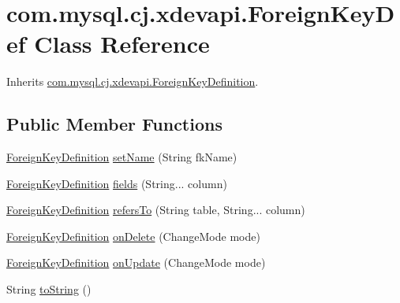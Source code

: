 \hypertarget{classcom_1_1mysql_1_1cj_1_1xdevapi_1_1_foreign_key_def}{}\section{com.\+mysql.\+cj.\+xdevapi.\+Foreign\+Key\+Def Class Reference}
\label{classcom_1_1mysql_1_1cj_1_1xdevapi_1_1_foreign_key_def}


Inherits \mbox{\hyperlink{interfacecom_1_1mysql_1_1cj_1_1xdevapi_1_1_foreign_key_definition}{com.\+mysql.\+cj.\+xdevapi.\+Foreign\+Key\+Definition}}.

\subsection*{Public Member Functions}
\begin{DoxyCompactItemize}
\item 
\mbox{\hyperlink{interfacecom_1_1mysql_1_1cj_1_1xdevapi_1_1_foreign_key_definition}{Foreign\+Key\+Definition}} \mbox{\hyperlink{classcom_1_1mysql_1_1cj_1_1xdevapi_1_1_foreign_key_def_a39b5a6f9c5dc4307b38a87109cd4784d}{set\+Name}} (String fk\+Name)
\item 
\mbox{\hyperlink{interfacecom_1_1mysql_1_1cj_1_1xdevapi_1_1_foreign_key_definition}{Foreign\+Key\+Definition}} \mbox{\hyperlink{classcom_1_1mysql_1_1cj_1_1xdevapi_1_1_foreign_key_def_acc462cbe87a4a3c4b53244d86a258070}{fields}} (String... column)
\item 
\mbox{\hyperlink{interfacecom_1_1mysql_1_1cj_1_1xdevapi_1_1_foreign_key_definition}{Foreign\+Key\+Definition}} \mbox{\hyperlink{classcom_1_1mysql_1_1cj_1_1xdevapi_1_1_foreign_key_def_a0e7ccf961a3a7bbf2d86a9b5765645d5}{refers\+To}} (String table, String... column)
\item 
\mbox{\hyperlink{interfacecom_1_1mysql_1_1cj_1_1xdevapi_1_1_foreign_key_definition}{Foreign\+Key\+Definition}} \mbox{\hyperlink{classcom_1_1mysql_1_1cj_1_1xdevapi_1_1_foreign_key_def_ab48bb84405808abf198c08595d60f438}{on\+Delete}} (Change\+Mode mode)
\item 
\mbox{\hyperlink{interfacecom_1_1mysql_1_1cj_1_1xdevapi_1_1_foreign_key_definition}{Foreign\+Key\+Definition}} \mbox{\hyperlink{classcom_1_1mysql_1_1cj_1_1xdevapi_1_1_foreign_key_def_a02ca9d5d8bf9f81a8b0f2dc7b8a6861f}{on\+Update}} (Change\+Mode mode)
\item 
String \mbox{\hyperlink{classcom_1_1mysql_1_1cj_1_1xdevapi_1_1_foreign_key_def_a5b869e38335874c6a693023d4c9ced9a}{to\+String}} ()
\end{DoxyCompactItemize}
